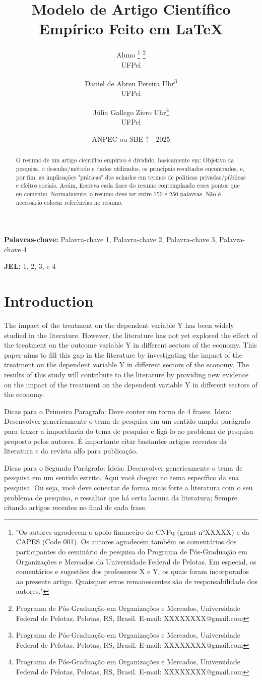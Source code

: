 \documentclass[a4paper]{article}
\title{Modelo de Artigo Científico Empírico Feito em LaTeX}
\author{Aluno \footnote{"Os autores agradecem o apoio financeiro do CNPq (grant n°XXXXX) e da CAPES (Code 001). Os autores agradecem também os comentários dos participantes do seminário de pesquisa do Programa de Pós-Graduação em Organizações e Mercados da Universidade Federal de Pelotas. Em especial, os comentários e sugestões dos professores X e Y, os quais foram incorporados ao presente artigo. Quaisquer erros remanescentes são de responsabilidade dos autores."} \footnote{Programa de Pós-Graduação em Organizações e Mercados, Universidade Federal de Pelotas, Pelotas, RS, Brasil. E-mail: XXXXXXXX@gmail.com} \\ UFPel \and Daniel de Abreu Pereira Uhr\footnote{Programa de Pós-Graduação em Organizações e Mercados, Universidade Federal de Pelotas, Pelotas, RS, Brasil. E-mail: XXXXXXXX@gmail.com} \\ UFPel \and Júlia Gallego Ziero Uhr\footnote{Programa de Pós-Graduação em Organizações e Mercados, Universidade Federal de Pelotas, Pelotas, RS, Brasil. E-mail: XXXXXXXX@gmail.com} \\ UFPel}
\date{ANPEC ou SBE ? - 2025}
\begin{document}
\maketitle 

\begin{abstract}
O resumo de um artigo científico empírico é dividido, basicamente em: Objetivo da pesquisa, o desenho/método e dados utilizados, os principais resultados encontrados, e, por fim, as implicações "práticas" dos achados em termos de políticas privadas/públicas e efeitos sociais. Assim, Escreva cada frase do resumo contemplando esses pontos que eu comentei. Normalmente, o resumo deve ter entre 150 e 250 palavras. Não é necessário colocar referências no resumo.
\end{abstract}

\textbf{Palavras-chave:} Palavra-chave 1, Palavra-chave 2, Palavra-chave 3, Palavra-chave 4

\textbf{JEL:}  1, 2, 3, e 4

\section{Introduction}

The impact of the treatment on the dependent variable Y has been widely studied in the literature. However, the literature has not yet explored the effect of the treatment on the outcome variable Y in different sectors of the economy. This paper aims to fill this gap in the literature by investigating the impact of the treatment on the dependent variable Y in different sectors of the economy. The results of this study will contribute to the literature by providing new evidence on the impact of the treatment on the dependent variable Y in different sectors of the economy.


Dicas para o Primeiro Paragrafo: Deve conter em torno de 4 frases. Ideia: Desenvolver genericamente o tema de pesquisa em um sentido amplo; parágrafo para trazer a importância do tema de pesquisa e ligá-lo ao problema de pesquisa proposto pelos autores. É importante citar bastantes artigos recentes da literatura e da revista alfo para publicação.

Dicas para o Segundo Parágrafo: Ideia: Desenvolver genericamente o tema de pesquisa em um sentido estrito. Aqui você chegou no tema específico da sua pesquisa. Ou seja, você deve conectar de forma mais forte a literatura com o seu problema de pesquisa, e ressaltar que há certa lacuna da literatura; Sempre citando artigos recentes no final de cada frase.
\end{document}
